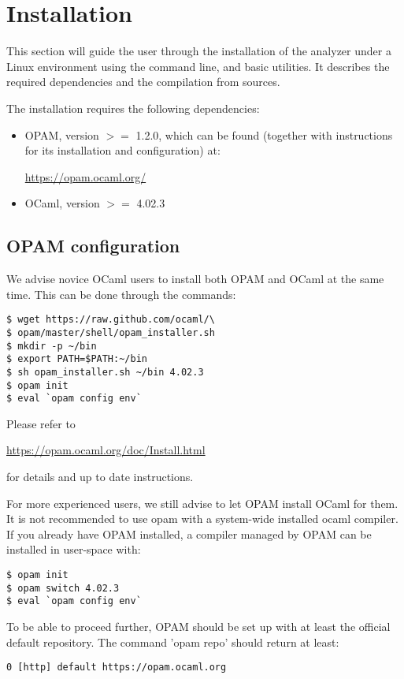 \section{Installation}
This section will guide the user through the installation of the \memcad
analyzer under a Linux environment using the command line, and basic
utilities.
It describes the required dependencies and the compilation from sources.

The installation requires the following dependencies:
\begin{itemize}
\item OPAM, version $>=$ 1.2.0, which can be found (together with
  instructions for its installation and configuration) at:
  \begin{center}
    \url{https://opam.ocaml.org/}
  \end{center}
\item OCaml, version $>=$ 4.02.3
\end{itemize}

\subsection{OPAM configuration}
We advise novice OCaml users to install both OPAM and OCaml
at the same time.
This can be done through the commands:
\begin{verbatim}
$ wget https://raw.github.com/ocaml/\
$ opam/master/shell/opam_installer.sh
$ mkdir -p ~/bin
$ export PATH=$PATH:~/bin
$ sh opam_installer.sh ~/bin 4.02.3
$ opam init
$ eval `opam config env`
\end{verbatim}
Please refer to
\begin{center}
  \url{https://opam.ocaml.org/doc/Install.html}
\end{center}
for details and up to date instructions.

For more experienced users, we still advise to let OPAM install OCaml for them.
It is not recommended to use opam with a system-wide installed ocaml compiler.
If you already have OPAM installed, a compiler managed by OPAM
can be installed in user-space with:
\begin{verbatim}
$ opam init
$ opam switch 4.02.3
$ eval `opam config env`
\end{verbatim}

To be able to proceed further, OPAM should be set up
with at least the official default repository.
The command 'opam repo' should return at least:
\begin{verbatim}
0 [http] default https://opam.ocaml.org
\end{verbatim}

